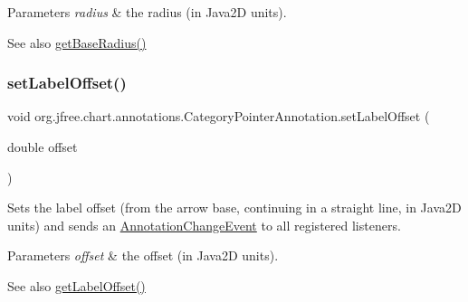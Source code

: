 \begin{DoxyParams}{Parameters}
{\em radius} & the radius (in Java2D units).\\
\hline
\end{DoxyParams}
\begin{DoxySeeAlso}{See also}
\mbox{\hyperlink{classorg_1_1jfree_1_1chart_1_1annotations_1_1_category_pointer_annotation_a5e053ef26450a0e636562e187c0f0f1e}{get\+Base\+Radius()}} 
\end{DoxySeeAlso}
\mbox{\label{classorg_1_1jfree_1_1chart_1_1annotations_1_1_category_pointer_annotation_ae3941b11e27c687715635e67d364db88}} 
\subsubsection{\texorpdfstring{set\+Label\+Offset()}{setLabelOffset()}}
{\footnotesize\ttfamily void org.\+jfree.\+chart.\+annotations.\+Category\+Pointer\+Annotation.\+set\+Label\+Offset (\begin{DoxyParamCaption}\item[{double}]{offset }\end{DoxyParamCaption})}

Sets the label offset (from the arrow base, continuing in a straight line, in Java2D units) and sends an \mbox{\hyperlink{}{Annotation\+Change\+Event}} to all registered listeners.


\begin{DoxyParams}{Parameters}
{\em offset} & the offset (in Java2D units).\\
\hline
\end{DoxyParams}
\begin{DoxySeeAlso}{See also}
\mbox{\hyperlink{classorg_1_1jfree_1_1chart_1_1annotations_1_1_category_pointer_annotation_afd01fc3fde080f86d3491cb491d84cad}{get\+Label\+Offset()}} 
\end{DoxySeeAlso}
\mbox{\label{classorg_1_1jfree_1_1chart_1_1annotations_1_1_category_pointer_annotation_af59eb6536b65466595853197e7e0c29d}} 
